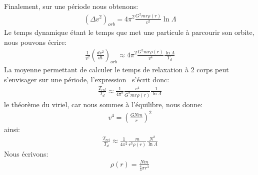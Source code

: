 Finalement, sur une période nous obtenons:
\begin{align*}
	\left(\Delta v^{2}\right)_{orb}=4\pi^{2}\frac{G^{2}mr\rho\left(r\right)}{v^{2}}\ln \Lambda
\end{align*}
Le temps dynamique étant le temps que met une particule à parcourir son orbite, nous pouvons écrire:
\begin{align*}
	\frac{1}{v^{2}}\left(\frac{dv^{2}}{dt}\right)_{orb}\approx4\pi^{2}\frac{G^{2}mr\rho\left(r\right)}{v^{4}}\frac{\ln \Lambda}{T_{d}}%
\end{align*}
La moyenne permettant de calculer le temps de relaxation à 2 corps peut s'envisager sur une période, l'expression~ s'écrit donc:
\begin{align*}
	\frac{T_{rel}}{T_{d}}\approx\frac{1}{4\pi^{2}}\frac{v^{4}}{G^{2}mr\rho\left(  r\right)  }\frac{1}{\ln \Lambda}%
\end{align*}
le théorème du viriel, car nous sommes à l'équilibre, nous donne:
\begin{align*}
	v^{4}=\left(\frac{GNm}{r}\right)^{2}%
\end{align*}
ainsi:
\begin{align*}
	\frac{T_{rel}}{T_{d}}\approx\frac{1}{4\pi^{2}}\frac{m}{r^{3}\rho\left(r\right)}\frac{N^{2}}{\ln \Lambda}
\end{align*}
Nous écrivons:
\begin{align*}
	\rho\left(r\right)=\frac{Nm}{\frac{4}{3}\pi r^{3}}%
\end{align*}
